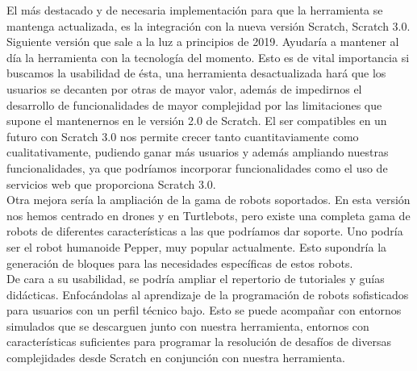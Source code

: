 El más destacado y de necesaria implementación para que la herramienta se mantenga actualizada, es la integración con la nueva versión Scratch, Scratch 3.0. Siguiente versión que sale a la luz a principios de 2019. Ayudaría a mantener al día la herramienta con la tecnología del momento. Esto es de vital importancia si buscamos la usabilidad de ésta, una herramienta desactualizada hará que los usuarios se decanten por otras de mayor valor, además de impedirnos el desarrollo de funcionalidades de mayor complejidad por las limitaciones que supone el mantenernos en le versión 2.0 de Scratch. El ser compatibles en un futuro con Scratch 3.0 nos permite crecer tanto cuantitaviamente como cualitativamente, pudiendo ganar más usuarios y además ampliando nuestras funcionalidades, ya que podríamos incorporar funcionalidades como el uso de servicios web que proporciona Scratch 3.0. \\

Otra mejora sería la ampliación de la gama de robots soportados. En esta versión nos hemos centrado en drones y en Turtlebots, pero existe una completa gama de robots de diferentes características a las que podríamos dar soporte. Uno podría ser el robot humanoide Pepper, muy popular actualmente. Esto supondría la generación de bloques para las necesidades específicas de estos robots.\\

De cara a su usabilidad, se podría ampliar el repertorio de tutoriales y guías didácticas. Enfocándolas al aprendizaje de la programación de robots sofisticados para usuarios con un perfil técnico bajo. Esto se puede acompañar con entornos simulados que se descarguen junto con nuestra herramienta, entornos con características suficientes para programar la resolución de desafíos de diversas complejidades desde Scratch en conjunción con nuestra herramienta.\\